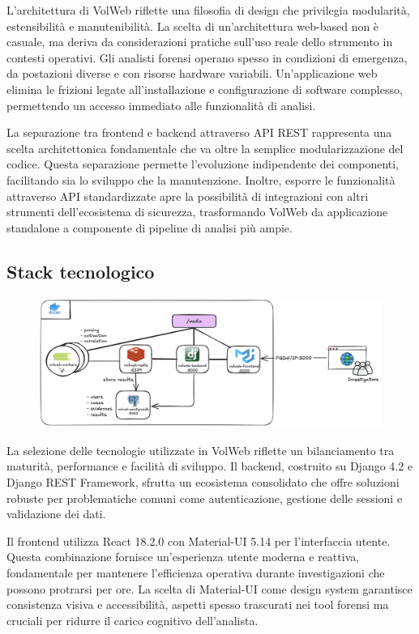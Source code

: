 L'architettura di VolWeb riflette una filosofia di design che privilegia modularità, estensibilità e manutenibilità. La scelta di un'architettura web-based non è casuale, ma deriva da considerazioni pratiche sull'uso reale dello strumento in contesti operativi. Gli analisti forensi operano spesso in condizioni di emergenza, da postazioni diverse e con risorse hardware variabili. Un'applicazione web elimina le frizioni legate all'installazione e configurazione di software complesso, permettendo un accesso immediato alle funzionalità di analisi.

La separazione tra frontend e backend attraverso API REST \cite{restapi} rappresenta una scelta architettonica fondamentale che va oltre la semplice modularizzazione del codice. Questa separazione permette l'evoluzione indipendente dei componenti, facilitando sia lo sviluppo che la manutenzione. Inoltre, esporre le funzionalità attraverso API standardizzate apre la possibilità di integrazioni con altri strumenti dell'ecosistema di sicurezza, trasformando VolWeb da applicazione standalone a componente di pipeline di analisi più ampie.

\subsection{Stack tecnologico}

\begin{figure}[H]
    \centering   \includegraphics[width=1\linewidth]{images/volweb-original/volweb-arch.png}
\end{figure}

La selezione delle tecnologie utilizzate in VolWeb riflette un bilanciamento tra maturità, performance e facilità di sviluppo. Il backend, costruito su Django 4.2 e Django REST Framework, sfrutta un ecosistema consolidato che offre soluzioni robuste per problematiche comuni come autenticazione, gestione delle sessioni e validazione dei dati.

Il frontend utilizza React 18.2.0 con Material-UI 5.14 per l'interfaccia utente. Questa combinazione fornisce un'esperienza utente moderna e reattiva, fondamentale per mantenere l'efficienza operativa durante investigazioni che possono protrarsi per ore. La scelta di Material-UI come design system garantisce consistenza visiva e accessibilità, aspetti spesso trascurati nei tool forensi ma cruciali per ridurre il carico cognitivo dell'analista.

